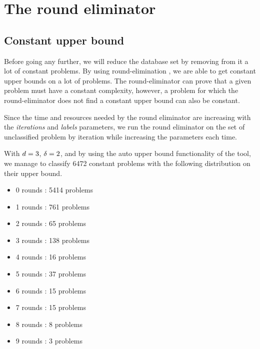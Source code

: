 \section{The round eliminator}
\subsection{Constant upper bound}
Before going any further, we will reduce the database set by removing from it a lot of constant problems.
By using round-elimination \cite{round-eliminator}, we are able to get constant upper bounds on a lot of problems. The round-eliminator can prove that a given problem must have a constant complexity, however, a problem for which the round-eliminator does not find a constant upper bound can also be constant.

Since the time and resources needed by the round eliminator are increasing with the \textit{iterations} and \textit{labels} parameters, we run the round eliminator on the set of unclassified problem by iteration while increasing the parameters each time.

With $d = 3$, $\delta = 2$, and by using the auto upper bound functionality of the tool, we manage to classify 6472 constant problems with the following distribution on their upper bound.
\begin{itemize}
    \item 0 rounds : 5414 problems
    \item 1 rounds : 761 problems
    \item 2 rounds : 65 problems
    \item 3 rounds : 138 problems
    \item 4 rounds : 16 problems
    \item 5 rounds : 37 problems
    \item 6 rounds : 15 problems
    \item 7 rounds : 15 problems
    \item 8 rounds : 8 problems
    \item 9 rounds : 3 problems
\end{itemize}

